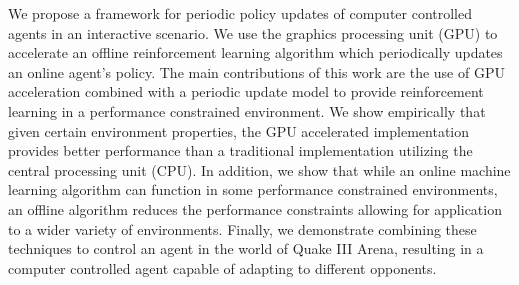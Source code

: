 \begin{umiabstract}
    We propose a framework for periodic policy updates of computer controlled agents in an interactive scenario. We use the graphics processing unit (GPU) to accelerate an offline reinforcement learning algorithm which periodically updates an online agent's policy. The main contributions of this work are the use of GPU acceleration combined with a periodic update model to provide reinforcement learning in a performance constrained environment. We show empirically that given certain environment properties, the GPU accelerated implementation provides better performance than a traditional implementation utilizing the central processing unit (CPU). In addition, we show that while an online machine learning algorithm can function in some performance constrained environments, an offline algorithm reduces the performance constraints allowing for application to a wider variety of environments. Finally, we demonstrate combining these techniques to control an agent in the world of Quake III Arena, resulting in a computer controlled agent capable of adapting to different opponents.
\end{umiabstract}

\clearpage{}
